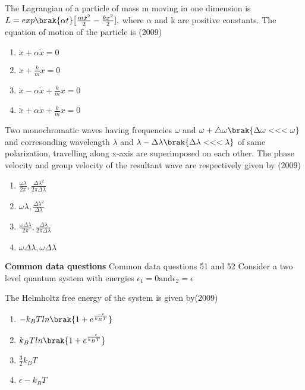 
\iffalse
\chapter{2009}
\author{AI24BTECH11008}
\section{ph}
\fi

    \item[49.] The Lagrangian of a particle of mass m moving in one dimension is $ L = exp\brak{\alpha t}\big[\frac{m\dot{x}^2}{2}-\frac{kx^2}{2}],$ where $\alpha$ and k are positive constants. The equation of motion of the particle is  \hfill (2009)
     \begin{enumerate}[label=(\Alph*)]
        \item $\ddot{x}+\alpha \dot{x} = 0$
        \item $\ddot{x}+\frac{k}{m}x = 0$
        \item $\ddot{x}-\alpha \dot{x}+\frac{k}{m}x = 0$
        \item $\ddot{x}+\alpha \dot{x}+\frac{k}{m}x = 0$
     \end{enumerate}
     \item[50.] Two monochromatic waves having frequencies $\omega$ and $\omega + \triangle \omega \brak{\Delta\omega<<<\omega}$ and corresonding wavelength $\lambda$ and $\lambda-\Delta\lambda\brak{\Delta\lambda<<<\lambda}$ of same polarization, travelling along x-axis are superimposed on each other. The phase velocity and group velocity of the resultant wave are respectively given by \hfill (2009)
     \begin{enumerate}[label=(\Alph*)]
         \item $\frac{\omega\lambda}{2\pi},\frac{\Delta\lambda ^2}{2\pi\Delta\lambda}$
         \item $\omega\lambda,\frac{\Delta\lambda ^2}{\Delta\lambda}$
         \item $\frac{\omega\Delta\lambda}{2\pi},\frac{\Delta\lambda}{2\pi\Delta\lambda}$
         \item $\omega\Delta\lambda,\omega\Delta\lambda$
     \end{enumerate}
     \textbf{Common data questions}
     Common data questions 51 and 52
     Consider a two level quantum system with energies $\epsilon_1=0 \text{and} \epsilon_2 = \epsilon$
     \item[51.] The Helmholtz free energy of the system is given by\hfill (2009)
     \begin{enumerate}[label=(\Alph*)]
        \item $-k_BTln\brak{1+e^{\frac{-\epsilon}{k_BT}}}$
        \item $k_BTln\brak{1+e^{\frac{-\epsilon}{k_BT}}}$
        \item $\frac{3}{2}k_B T$
        \item $\epsilon - k_BT$
     \end{enumerate}
